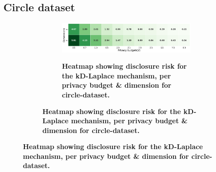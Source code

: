 \subsection{Circle dataset} \label{appendix:results-privacy-circle-dataset}
\begin{figure}
    \centering
    \begin{subfigure}[b]{0.85\textwidth}
        \begin{subfigure}[c]{1\textwidth}
            \caption{\textbf{Heatmap showing disclosure risk for the kD-Laplace mechanism, per privacy budget \& dimension for circle-dataset.}}
            \includegraphics[width=1\textwidth]{Results/kd-laplace/kd-Laplace/circle-dataset/distance.png}
            \label{fig:privacy-risk_circle-dataset_adversial_advantage_kd-laplace}
        \end{subfigure}
        \vfill %


\end{subfigure}
\end{figure}
